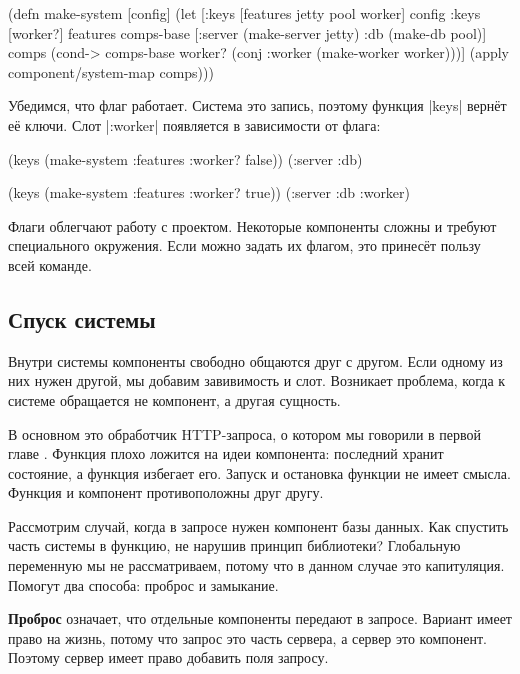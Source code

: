 \begin{english}
  \begin{clojure}
(defn make-system [config]
  (let [{:keys [features jetty pool worker]} config
        {:keys [worker?]} features
        comps-base [:server (make-server jetty)
                    :db (make-db pool)]
        comps (cond-> comps-base
                worker?
                (conj :worker (make-worker worker)))]
    (apply component/system-map comps)))
  \end{clojure}
\end{english}

Убедимся, что флаг работает. Система это запись, поэтому функция \spverb|keys|
верн\"{е}т е\"{е} ключи. Слот \spverb|:worker| появляется в зависимости от флага:

\begin{english}
  \begin{clojure}
(keys (make-system {:features {:worker? false}}))
(:server :db)

(keys (make-system {:features {:worker? true}}))
(:server :db :worker)
  \end{clojure}
\end{english}

Флаги облегчают работу с проектом. Некоторые компоненты сложны и требуют
специального окружения. Если можно задать их флагом, это принес\"{е}т пользу
всей команде.

\subsection{Спуск системы}

Внутри системы компоненты свободно общаются друг с другом. Если одному из них
нужен другой, мы добавим завивимость и слот. Возникает проблема, когда к системе
обращается не компонент, а другая сущность.

В основном это обработчик HTTP-запроса, о котором мы говорили в первой
главе . Функция плохо ложится на идеи компонента: последний
хранит состояние, а функция избегает его. Запуск и остановка функции не имеет
смысла. Функция и компонент противоположны друг другу.

Рассмотрим случай, когда в запросе нужен компонент базы данных. Как спустить
часть системы в функцию, не нарушив принцип библиотеки? Глобальную переменную мы
не рассматриваем, потому что в данном случае это капитуляция. Помогут два
способа: проброс и замыкание.

\textbf{Проброс} означает, что отдельные компоненты передают в запросе. Вариант
имеет право на жизнь, потому что запрос это часть сервера, а сервер это
компонент. Поэтому сервер имеет право добавить поля запросу.

